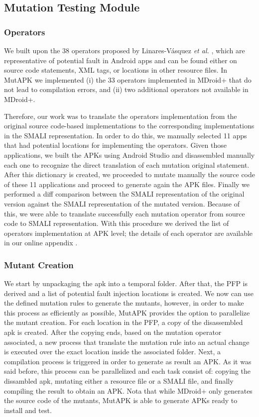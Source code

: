 \subsection{Mutation Testing Module}
\subsubsection{Operators}
\label{sssec:imo}
We built upon the 38 operators proposed by  Linares-V\'asquez \emph{et al.} \cite{linares2017enabling,Moran:ICSE18} , which are representative of  potential fault in Android apps and  can be found either on  source code statements, XML tags, or locations in other resource files. In MutAPK we implemented (i) the 33 operators implemented in MDroid+ that do not lead to compilation errors, and (ii) two additional operators not available in MDroid+.

 
Therefore, our work was to translate the  operators implementation from the original source code-based implementations to the corresponding implementations in the SMALI representation. In order to do this, we manually selected 11 apps that had potential locations for implementing the operators. Given those applications, we built the APKs using Android Studio and disassembled manually each one to recognize the direct translation of each mutation original statement. After this dictionary is created, we proceeded to mutate manually the source code of these 11 applications and proceed to generate again the APK files. Finally we performed a diff comparison between the SMALI representation of the original version against the SMALI representation of the mutated version. Because of this, we were able to translate successfully each mutation operator from source code to SMALI representation. With this procedure we derived the list of operators implementation at APK level; the details of each operator are available in our online appendix \cite{MutAPK}.

\subsubsection{Mutant Creation}

We start by unpackaging the apk into a temporal folder. After that, the PFP is derived and a list of potential fault injection locations is created. We now can use the defined mutation rules to generate the mutants, however, in order to make this process as efficiently as possible, MutAPK provides the option to parallelize the mutant creation. For each location in the PFP, a copy of the disassembled apk is created. After the copying ends, based on the mutation operator associated, a new process that translate the mutation rule into an actual change is executed over the exact location inside the associated folder. Next, a compilation process is triggered in order to generate as result an APK. As it was said before, this process can be parallelized and each task consist of: copying the dissambled apk, mutating either a resource file or a SMALI file, and finally compiling the result to obtain an APK.  Nota that while MDroid+ only generates the source code of the mutants, MutAPK is able to generate APKs ready to install and test.


